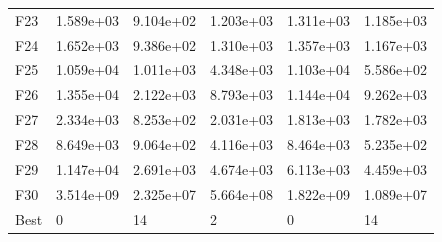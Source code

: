 \begin{tabular}{llllll}
F23  &  1.589e+03 &  9.104e+02 &  1.203e+03 &  1.311e+03 &  1.185e+03 \\
F24  &  1.652e+03 &  9.386e+02 &  1.310e+03 &  1.357e+03 &  1.167e+03 \\
F25  &  1.059e+04 &  1.011e+03 &  4.348e+03 &  1.103e+04 &  5.586e+02 \\
F26  &  1.355e+04 &  2.122e+03 &  8.793e+03 &  1.144e+04 &  9.262e+03 \\
F27  &  2.334e+03 &  8.253e+02 &  2.031e+03 &  1.813e+03 &  1.782e+03 \\
F28  &  8.649e+03 &  9.064e+02 &  4.116e+03 &  8.464e+03 &  5.235e+02 \\
F29  &  1.147e+04 &  2.691e+03 &  4.674e+03 &  6.113e+03 &  4.459e+03 \\
F30  &  3.514e+09 &  2.325e+07 &  5.664e+08 &  1.822e+09 &  1.089e+07 \\
Best &          0 &         14 &          2 &          0 &         14 \\
\bottomrule
\end{tabular}
